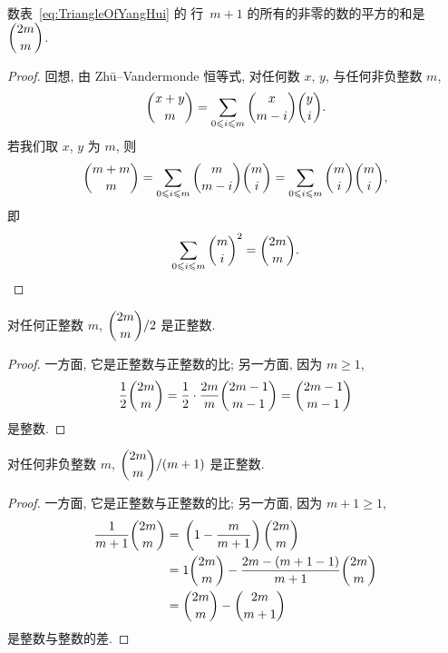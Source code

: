 \documentclass[../libro.tex]{subfiles}
\begin{document}
\begin{theorem}
    数表~\eqref{eq:TriangleOfYangHui} 的%
    行~\(m+1\) 的所有的非零的数的平方的和是 \(\dbinom{2m}{m}\).
\end{theorem}

\begin{proof}
    回想, 由 Zhū--Vandermonde 恒等式,
    对任何数 \(x\), \(y\), 与任何非负整数 \(m\),
    \begin{align*}
        \dbinom{x + y}{m}
        = \sum_{0 \leq i \leq m} {\dbinom{x}{m - i} \dbinom{y}{i}}.
    \end{align*}
    若我们取 \(x\), \(y\) 为 \(m\), 则
    \begin{align*}
        \dbinom{m + m}{m}
        = \sum_{0 \leq i \leq m} {\dbinom{m}{m - i} \dbinom{m}{i}}
        = \sum_{0 \leq i \leq m} {\dbinom{m}{i} \dbinom{m}{i}},
    \end{align*}
    即
    \begin{equation*}
        \sum_{0 \leq i \leq m} {\dbinom{m}{i}^2} = \dbinom{2m}{m}.
        \qedhere
    \end{equation*}
\end{proof}

\begin{theorem}
    对任何正整数 \(m\),
    \(\dbinom{2m}{m} / 2\) 是正整数.
\end{theorem}

\begin{proof}
    一方面, 它是正整数与正整数的比;
    另一方面, 因为 \(m \geq 1\),
    \begin{align*}
        \frac{1}{2} \dbinom{2m}{m}
        = \frac{1}{2} \cdot \frac{2m}{m} \dbinom{2m-1}{m-1}
        = \dbinom{2m-1}{m-1}
    \end{align*}
    是整数.
\end{proof}

\begin{theorem}
    对任何非负整数 \(m\),
    \(\dbinom{2m}{m} / (m + 1)\) 是正整数.
\end{theorem}

\begin{proof}
    一方面, 它是正整数与正整数的比;
    另一方面, 因为 \(m + 1 \geq 1\),
    \begin{align*}
        \frac{1}{m+1} \dbinom{2m}{m}
        = {} &
        \left(1 - \frac{m}{m+1}\right) \dbinom{2m}{m}
        \\
        = {} &
        1 \dbinom{2m}{m}
        - \frac{2m - (m+1 - 1)}{m+1} \dbinom{2m}{m}
        \\
        = {} &
        \dbinom{2m}{m} - \dbinom{2m}{m+1}
    \end{align*}
    是整数与整数的差.
\end{proof}
\end{document}
